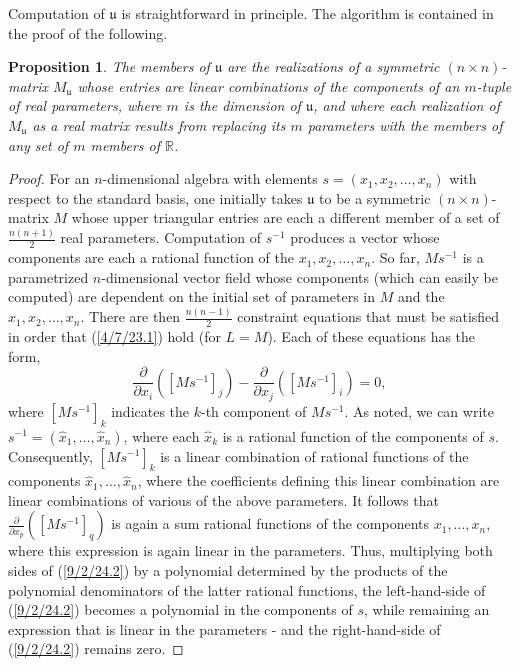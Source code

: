 \documentclass{amsart}
\numberwithin{equation}{section}
\newtheorem{proposition}[theorem]{Proposition}
\theoremstyle{definition}
\numberwithin{theorem}{section}
\begin{document}
Computation of $\mathfrak{u}$ is straightforward in principle.  The algorithm is contained in the proof of the following. 

\begin{proposition}\label{9/2/24.1} The members of $\mathfrak{u}$ are the realizations of a symmetric $(n\times n)$-matrix $M_{\mathfrak{u}}$ whose entries are linear combinations of the components of an $m$-tuple of real parameters, where $m$ is the dimension of $\mathfrak{u}$, and where each realization of $M_{\mathfrak{u}}$ as a real matrix results from replacing its $m$ parameters with the members of any set of $m$ members of $\mathbb{R}$.   
\end{proposition}

\begin{proof} For an $n$-dimensional algebra with elements $s = (x_1,x_2,\dots,x_n)$ with respect to the standard basis, one initially takes $\mathfrak{u}$ to be a symmetric $(n\times n)$-matrix $M$ whose upper triangular entries are each a different member of a set of $\frac{n(n+1)}{2}$ real parameters.  Computation of $s^{-1}$ produces a vector whose components are each a rational function of the $x_1,x_2,\dots,x_n$.  So far, $Ms^{-1}$ is a parametrized \mbox{$n$-dimensional} vector field whose components (which can easily be computed) are dependent on the initial set of parameters in $M$ and the $x_1,x_2,\dots,x_n$.  There are then $\frac{n(n-1)}{2}$ constraint equations that must be satisfied in order that (\ref{4/7/23.1}) hold (for $L=M$).  Each of these equations has the form, \begin{equation}\label{9/2/24.2} \frac{\partial}{\partial x_i}([Ms^{-1}]_j) - \frac{\partial}{\partial x_j}([Ms^{-1}]_i) = 0,\end{equation} where $[Ms^{-1}]_k$ indicates the $k$-th component of $Ms^{-1}$.  As noted, we can write $s^{-1} = (\hat{x}_1,\dots,\hat{x}_n)$, where each $\hat{x}_k$ is a rational function of the components of $s$.  Consequently, $[Ms^{-1}]_k$ is a linear combination of rational functions of the components $\hat{x}_1,\dots,\hat{x}_n$, where the coefficients defining this linear combination are linear combinations of various of the above parameters.  It follows that $\frac{\partial}{\partial x_p}([Ms^{-1}]_q)$ is again a sum rational functions of the components $x_1,\dots,x_n$, where this expression is again linear in the parameters.  Thus, multiplying both sides of (\ref{9/2/24.2}) by a polynomial determined by the products of the polynomial denominators of the latter rational functions, the left-hand-side of (\ref{9/2/24.2}) becomes a polynomial in the components of $s$, while remaining an expression that is linear in the parameters - and the right-hand-side of (\ref{9/2/24.2}) remains zero.

\end{proof}
\end{document}
